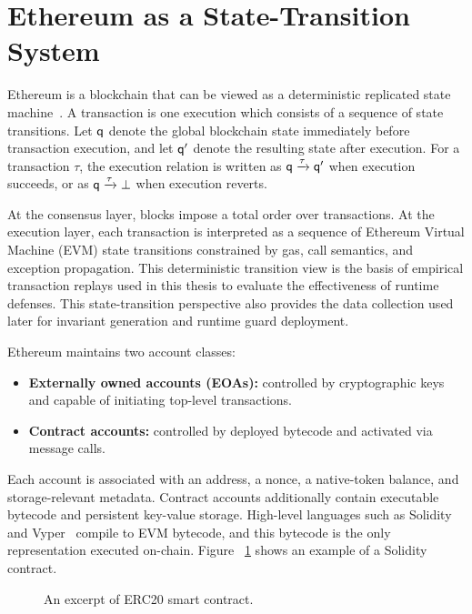 \section{Ethereum as a State-Transition System}
Ethereum is a blockchain that can be viewed as a deterministic replicated
state machine~\cite{ethereum22,buterin2014ethereum}.
A transaction is
one execution which consists of a sequence of state transitions.
Let $\mathsf{q}$ denote the global blockchain state
immediately before transaction execution,
and let $\mathsf{q}'$ denote the resulting state after
execution. For a transaction $\tau$, the execution
relation is written as $\mathsf{q} \xrightarrow{\tau} \mathsf{q}'$ when
execution succeeds, or as $\mathsf{q} \xrightarrow{\tau} \bot$ when
execution reverts.

At the consensus layer, blocks impose a total order over
transactions. At the execution layer, each transaction
is interpreted as a sequence of Ethereum Virtual Machine (EVM)
state transitions
constrained by gas, call semantics, and exception propagation.
This deterministic transition view is the basis
of empirical transaction replays used in this thesis to
evaluate the effectiveness of runtime defenses.
This state-transition perspective also provides
the data collection used later for invariant generation
 and runtime guard deployment.

Ethereum maintains two account classes:
\begin{itemize}
    \item \textbf{Externally owned accounts (EOAs):}
    controlled by cryptographic keys and capable of
    initiating top-level transactions.
    \item \textbf{Contract accounts:} controlled
    by deployed bytecode and activated via message calls.
\end{itemize}

Each account is associated with an address,
a nonce, a native-token balance, and storage-relevant
metadata. Contract accounts additionally
contain executable bytecode and persistent key-value
storage. High-level languages such as
Solidity~\cite{solidity} and Vyper~\cite{vyper} compile to
EVM bytecode, and this bytecode is the only
representation executed on-chain. Figure
~\ref{fig:ERC20} shows an example of a Solidity contract.



\begin{figure}[t]
    \centering
    \begin{minipage}[h]{0.9\linewidth}
    
    \end{minipage}
    \caption{An excerpt of ERC20 smart contract.}
    \label{fig:ERC20}
    \vspace{-2mm}
\end{figure}



